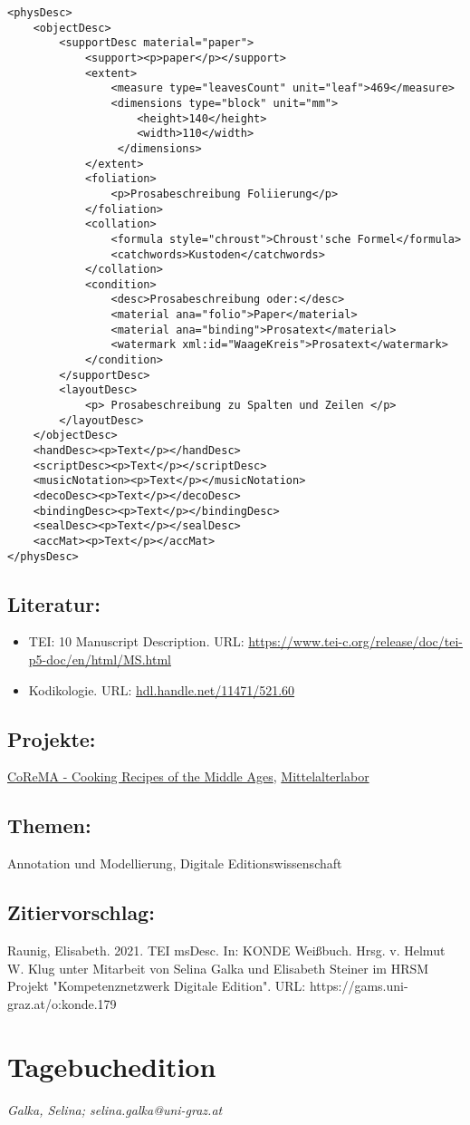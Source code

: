 \documentclass{article}
\begin{document}
        \begin{verbatim}<physDesc>
    <objectDesc>
        <supportDesc material="paper">
            <support><p>paper</p></support>
            <extent>
                <measure type="leavesCount" unit="leaf">469</measure>
                <dimensions type="block" unit="mm">
                    <height>140</height>
                    <width>110</width>
                 </dimensions>
            </extent>
            <foliation>
                <p>Prosabeschreibung Foliierung</p>
            </foliation>
            <collation>
                <formula style="chroust">Chroust'sche Formel</formula>
                <catchwords>Kustoden</catchwords>
            </collation>
            <condition>
                <desc>Prosabeschreibung oder:</desc>
                <material ana="folio">Paper</material>
                <material ana="binding">Prosatext</material>
                <watermark xml:id="WaageKreis">Prosatext</watermark>
            </condition>
        </supportDesc>
        <layoutDesc>
            <p> Prosabeschreibung zu Spalten und Zeilen </p>
        </layoutDesc>
    </objectDesc>
    <handDesc><p>Text</p></handDesc>
    <scriptDesc><p>Text</p></scriptDesc>
    <musicNotation><p>Text</p></musicNotation>
    <decoDesc><p>Text</p></decoDesc>
    <bindingDesc><p>Text</p></bindingDesc>
    <sealDesc><p>Text</p></sealDesc>
    <accMat><p>Text</p></accMat>
</physDesc>\end{verbatim}\subsection*{Literatur:}\begin{itemize}\item TEI: 10 Manuscript Description. URL: \url{https://www.tei-c.org/release/doc/tei-p5-doc/en/html/MS.html}\item Kodikologie. URL: \url{hdl.handle.net/11471/521.60}\end{itemize}\subsection*{Projekte:}\href{https://gams.uni-graz.at/corema}{CoReMA -
                           Cooking Recipes of the Middle Ages}, \href{http://gams.uni-graz.at/context:malab}{Mittelalterlabor}\subsection*{Themen:}Annotation und Modellierung, Digitale Editionswissenschaft\subsection*{Zitiervorschlag:}Raunig, Elisabeth. 2021. TEI msDesc. In: KONDE Weißbuch. Hrsg. v. Helmut W. Klug unter Mitarbeit von Selina Galka und Elisabeth Steiner im HRSM Projekt "Kompetenznetzwerk Digitale Edition". URL: https://gams.uni-graz.at/o:konde.179\newpage\section*{Tagebuchedition} \emph{Galka, Selina; selina.galka@uni-graz.at }\\
        
\end{document}
